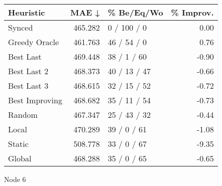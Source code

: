 \begin{tabular}{lrlr}
\toprule
\textbf{Heuristic} & \textbf{MAE ↓} & \textbf{\% Be/Eq/Wo} & \textbf{\% Improv.} \\
\midrule
            Synced &        465.282 &          0 / 100 / 0 &                0.00 \\
     Greedy Oracle &        461.763 &          46 / 54 / 0 &                0.76 \\
         Best Last &        469.448 &          38 / 1 / 60 &               -0.90 \\
       Best Last 2 &        468.373 &         40 / 13 / 47 &               -0.66 \\
       Best Last 3 &        468.615 &         32 / 15 / 52 &               -0.72 \\
    Best Improving &        468.682 &         35 / 11 / 54 &               -0.73 \\
            Random &        467.347 &         25 / 43 / 32 &               -0.44 \\
             Local &        470.289 &          39 / 0 / 61 &               -1.08 \\
            Static &        508.778 &          33 / 0 / 67 &               -9.35 \\
            Global &        468.288 &          35 / 0 / 65 &               -0.65 \\
\bottomrule
\end{tabular}
\caption{Node 6}
\label{tab:iid_lr05_le2_bs4_6}
